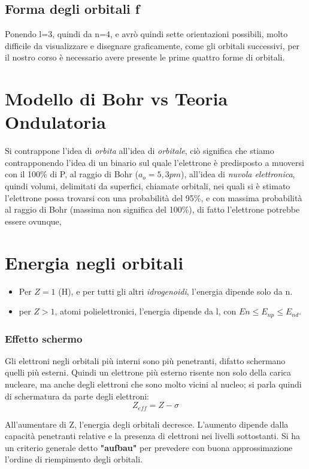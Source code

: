
\subsection{Forma degli orbitali f}
Ponendo l=3, quindi da n=4, e avrò quindi sette orientazioni possibili, molto difficile da visualizzare e disegnare graficamente, come gli orbitali successivi, per il nostro corso è necessario avere presente le prime quattro forme di orbitali.

\section{Modello di Bohr vs Teoria Ondulatoria}
Si contrappone l'idea di \emph{orbita} all'idea di \emph{orbitale}, ciò significa che stiamo contrapponendo l'idea di un binario sul quale l'elettrone è predisposto a muoversi con il 100\% di P, al raggio di Bohr ($a_o=5,3pm$), all'idea di \emph{nuvola elettronica}, quindi volumi, delimitati da superfici, chiamate orbitali, nei quali si è stimato l'elettrone possa trovarsi con una probabilità del 95\%, e con massima probabilità al raggio di Bohr (massima non significa del 100\%), di fatto l'elettrone potrebbe essere ovunque,

\section{Energia negli orbitali}
\begin{itemize}
    \item Per $Z=1$ (H), e per tutti gli altri \emph{idrogenoidi}, l'energia dipende solo da n. 
    \item per $Z>1$, atomi polielettronici, l'energia dipende da l, con $En\le E_{np} \le E_{nd}$.
\end{itemize}

\subsubsection{Effetto schermo}
Gli elettroni negli orbitali più interni sono più penetranti, difatto schermano quelli più esterni. Quindi un elettrone più esterno risente non solo della carica nucleare, ma anche degli elettroni che sono molto vicini al nucleo; si parla quindi di schermatura da parte degli elettroni: \[Z_{eff}=Z-\sigma\]


All'aumentare di Z, l'energia degli orbitali decresce. %
L'aumento dipende dalla capacità penetranti relative e la presenza di elettroni nei livelli sottostanti. 
Si ha un criterio generale detto \textbf{"aufbau"} per prevedere con buona approssimazione l'ordine di riempimento degli orbitali. 




